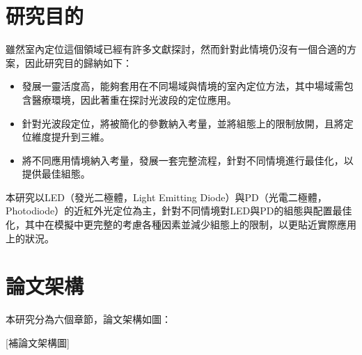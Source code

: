 




\section{研究目的}

雖然室內定位這個領域已經有許多文獻探討，然而針對此情境仍沒有一個合適的方案，因此研究目的歸納如下：


\begin{itemize} 
    \item 發展一靈活度高，能夠套用在不同場域與情境的室內定位方法，其中場域需包含醫療環境，因此著重在探討光波段的定位應用。  
    \item 針對光波段定位，將被簡化的參數納入考量，並將組態上的限制放開，且將定位維度提升到三維。
    \item 將不同應用情境納入考量，發展一套完整流程，針對不同情境進行最佳化，以提供最佳組態。
\end{itemize}


本研究以LED（發光二極體，Light Emitting Diode）與PD（光電二極體，Photodiode）的近紅外光定位為主，針對不同情境對LED與PD的組態與配置最佳化，其中在模擬中更完整的考慮各種因素並減少組態上的限制，以更貼近實際應用上的狀況。






\section{論文架構}
本研究分為六個章節，論文架構如圖：

[補論文架構圖]

